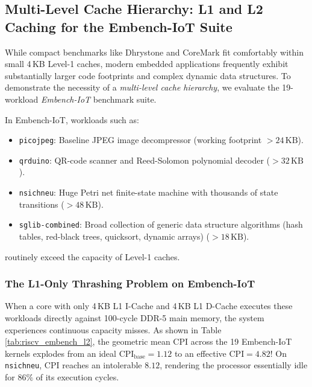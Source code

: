 \subsection{Multi-Level Cache Hierarchy: L1 and L2 Caching for the Embench-IoT Suite}\label{riscvL2Hierarchy}

While compact benchmarks like Dhrystone and CoreMark fit comfortably within small 4\,KB Level-1 caches, modern embedded applications frequently exhibit substantially larger code footprints and complex dynamic data structures. To demonstrate the necessity of a \textit{multi-level cache hierarchy}, we evaluate the 19-workload \textit{Embench-IoT} benchmark suite.

In Embench-IoT, workloads such as:
\begin{itemize}
    \item \texttt{picojpeg}: Baseline JPEG image decompressor (working footprint $>24\,\text{KB}$).
    \item \texttt{qrduino}: QR-code scanner and Reed-Solomon polynomial decoder ($>32\,\text{KB}$).
    \item \texttt{nsichneu}: Huge Petri net finite-state machine with thousands of state transitions ($>48\,\text{KB}$).
    \item \texttt{sglib-combined}: Broad collection of generic data structure algorithms (hash tables, red-black trees, quicksort, dynamic arrays) ($>18\,\text{KB}$).
\end{itemize}
routinely exceed the capacity of Level-1 caches.

\subsubsection{The L1-Only Thrashing Problem on Embench-IoT}
When a core with only 4\,KB L1 I-Cache and 4\,KB L1 D-Cache executes these workloads directly against 100-cycle DDR-5 main memory, the system experiences continuous capacity misses. As shown in Table \ref{tab:riscv_embench_l2}, the geometric mean CPI across the 19 Embench-IoT kernels explodes from an ideal $\text{CPI}_{\text{base}} = 1.12$ to an effective \textit{$\text{CPI} = 4.82$}! On \texttt{nsichneu}, CPI reaches an intolerable \textit{$8.12$}, rendering the processor essentially idle for $86\%$ of its execution cycles.

